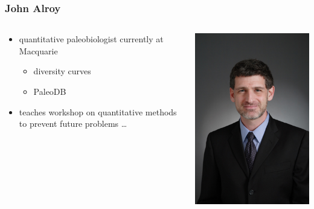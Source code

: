 \documentclass{beamer}
\begin{document}
  \begin{frame}
    \frametitle{John Alroy}
    \begin{columns}
      \begin{column}{0.5\textwidth}
          \begin{itemize}
            \item quantitative paleobiologist currently at Macquarie
            \begin{itemize}
              \item diversity curves
              \item PaleoDB
            \end{itemize}
            \item teaches workshop on quantitative methods to prevent future problems \ldots
          \end{itemize}
      \end{column}
      \begin{column}{0.5\textwidth}
      \includegraphics[width = \textwidth, keepaspectratio = true]{dr_john_alroy}
      \end{column}
    \end{columns}
  \end{frame}
\end{document}
